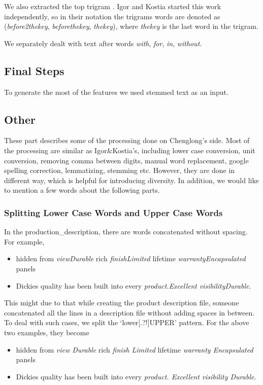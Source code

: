 \documentclass[12pt]{article}
\begin{document}
We also extracted the top trigram \cite{crowdflower_3place}. Igor and Kostia started this work independently, so in their notation the trigrams words are denoted as (\emph{before2thekey}, \emph{beforethekey}, \emph{thekey}), where \emph{thekey} is the last word in the trigram.

We separately dealt with text after words \emph{with}, \emph{for}, \emph{in}, \emph{without}.

\subsection{Final Steps}
To generate the most of the features we used stemmed text as an input.

\subsection{Other}
These part describes some of the processing done on Chenglong's side. Most of the processing are similar as Igor\&Kostia's, including lower case conversion, unit conversion, removing comma between digits, manual word replacement, google spelling correction, lemmatizing, stemming etc. However, they are done in different way, which is helpful for introducing diversity. In addition, we would like to mention a few words about the following parts.
\subsubsection{Splitting Lower Case Words and Upper Case Words}
In the production\_description, there are words concatenated without spacing. For example,
\begin{itemize}
\item hidden from \emph{viewDurable} rich \emph{finishLimited} lifetime \emph{warrantyEncapsulated} panels
\item Dickies quality has been built into every \emph{product.Excellent} \emph{visibilityDurable}.
\end{itemize}
This might due to that while creating the product description file, someone concatenated all the lines in a description file without adding spaces in between. To deal with such cases, we split the `lower[.?!]UPPER' pattern. For the above two examples, they become
\begin{itemize}
\item hidden from \emph{view Durable} rich \emph{finish Limited} lifetime \emph{warranty Encapsulated} panels
\item Dickies quality has been built into every \emph{product. Excellent} \emph{visibility Durable}.
\end{itemize}
\end{document}
